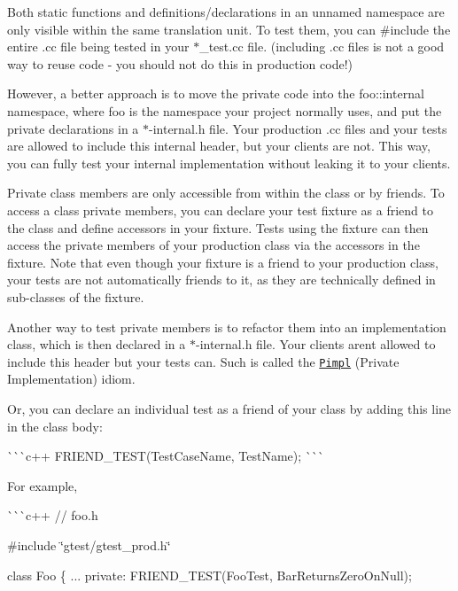 \begin{DoxyItemize}
\item Both static functions and definitions/declarations in an unnamed namespace are only visible within the same translation unit. To test them, you can {\ttfamily \#include} the entire {\ttfamily .cc} file being tested in your {\ttfamily $\ast$\+\_\+test.cc} file. (including {\ttfamily .cc} files is not a good way to reuse code -\/ you should not do this in production code!)

However, a better approach is to move the private code into the {\ttfamily foo\+::internal} namespace, where {\ttfamily foo} is the namespace your project normally uses, and put the private declarations in a {\ttfamily $\ast$-\/internal.h} file. Your production {\ttfamily .cc} files and your tests are allowed to include this internal header, but your clients are not. This way, you can fully test your internal implementation without leaking it to your clients.
\item Private class members are only accessible from within the class or by friends. To access a class\textquotesingle{} private members, you can declare your test fixture as a friend to the class and define accessors in your fixture. Tests using the fixture can then access the private members of your production class via the accessors in the fixture. Note that even though your fixture is a friend to your production class, your tests are not automatically friends to it, as they are technically defined in sub-\/classes of the fixture.

Another way to test private members is to refactor them into an implementation class, which is then declared in a {\ttfamily $\ast$-\/internal.h} file. Your clients aren\textquotesingle{}t allowed to include this header but your tests can. Such is called the \href{https://www.gamedev.net/articles/programming/general-and-gameplay-programming/the-c-pimpl-r1794/}{\tt Pimpl} (Private Implementation) idiom.

Or, you can declare an individual test as a friend of your class by adding this line in the class body\+:

\`{}\`{}\`{}c++ F\+R\+I\+E\+N\+D\+\_\+\+T\+E\+S\+T(\+Test\+Case\+Name, Test\+Name); \`{}\`{}\`{}

For example,

\`{}\`{}\`{}c++ // foo.\+h

\#include \char`\"{}gtest/gtest\+\_\+prod.\+h\char`\"{}

class Foo \{ ... private\+: F\+R\+I\+E\+N\+D\+\_\+\+T\+E\+S\+T(\+Foo\+Test, Bar\+Returns\+Zero\+On\+Null);


\end{DoxyItemize}
